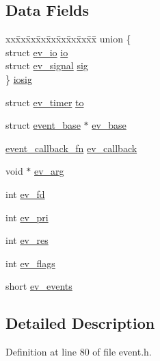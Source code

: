 \subsection*{\-Data \-Fields}
\begin{DoxyCompactItemize}
\item 
\begin{tabbing}
xx\=xx\=xx\=xx\=xx\=xx\=xx\=xx\=xx\=\kill
union \{\\
\>struct \hyperlink{structev__io}{ev\_io} \hyperlink{structevent_a8a4fa321488e67a96ad783dc24187c4c}{io}\\
\>struct \hyperlink{structev__signal}{ev\_signal} \hyperlink{structevent_ad3d5a2f9ab72029d05b260267e08eba1}{sig}\\
\} \hyperlink{structevent_a3fbb6fe0300dadbfebf8d1516f74082d}{iosig}\\

\end{tabbing}\item 
struct \hyperlink{structev__timer}{ev\-\_\-timer} \hyperlink{structevent_aba52a2d8ebe3e4d2e9bac349f661d509}{to}
\item 
struct \hyperlink{structevent__base}{event\-\_\-base} $\ast$ \hyperlink{structevent_a79005f93f769baaa5ab5d2a45b52ec62}{ev\-\_\-base}
\item 
\hyperlink{event_8h_a675c7b1b04923fb1b48f758222ab1333}{event\-\_\-callback\-\_\-fn} \hyperlink{structevent_a420d7cc7bf56d48aeeb1e27b52d7c829}{ev\-\_\-callback}
\item 
void $\ast$ \hyperlink{structevent_a680e2f70d6e4ce56b58f57e1182ffac1}{ev\-\_\-arg}
\item 
int \hyperlink{structevent_a7016497f14046277c71be6d4c1620890}{ev\-\_\-fd}
\item 
int \hyperlink{structevent_afc1b09b76d937eb994d6cdd3adf9ffcc}{ev\-\_\-pri}
\item 
int \hyperlink{structevent_acea2638a9075ad5d22ee179fda2fb8bc}{ev\-\_\-res}
\item 
int \hyperlink{structevent_a7facfe0f28541f092cd123c21e89c6c4}{ev\-\_\-flags}
\item 
short \hyperlink{structevent_a1c8a838880f1938d9ea23dcfee0419ea}{ev\-\_\-events}
\end{DoxyCompactItemize}


\subsection{\-Detailed \-Description}


\-Definition at line 80 of file event.\-h.



